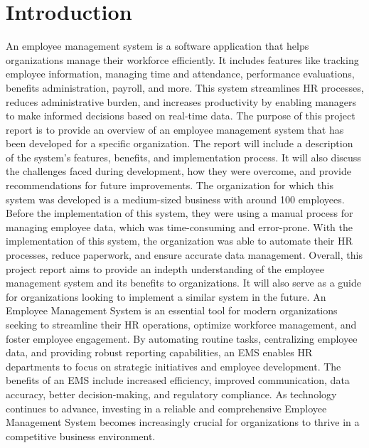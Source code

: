 \documentclass{article}
\begin{document}
\section{Introduction}
An employee management system is a software application that helps
organizations manage their workforce efficiently. It includes features like
tracking employee information, managing time and attendance,
performance evaluations, benefits administration, payroll, and more.
This system streamlines HR processes, reduces administrative burden,
and increases productivity by enabling managers to make informed
decisions based on real-time data. The purpose of this project report is
to provide an overview of an employee management system that has
been developed for a specific organization. The report will include a
description of the system's features, benefits, and implementation
process. It will also discuss the challenges faced during development,
how they were overcome, and provide recommendations for future
improvements. The organization for which this system was developed is
a medium-sized business with around 100 employees. Before the
implementation of this system, they were using a manual process for
managing employee data, which was time-consuming and error-prone.
With the implementation of this system, the organization was able to
automate their HR processes, reduce paperwork, and ensure accurate
data management. Overall, this project report aims to provide an indepth understanding of the employee management system and its
benefits to organizations. It will also serve as a guide for organizations
looking to implement a similar system in the future. An Employee
Management System is an essential tool for modern organizations
seeking to streamline their HR operations, optimize workforce
management, and foster employee engagement. By automating routine 
tasks, centralizing employee data, and providing robust reporting
capabilities, an EMS enables HR departments to focus on strategic
initiatives and employee development. The benefits of an EMS include
increased efficiency, improved communication, data accuracy, better
decision-making, and regulatory compliance. As technology continues to
advance, investing in a reliable and comprehensive Employee
Management System becomes increasingly crucial for organizations to
thrive in a competitive business environment.
\end{document}

